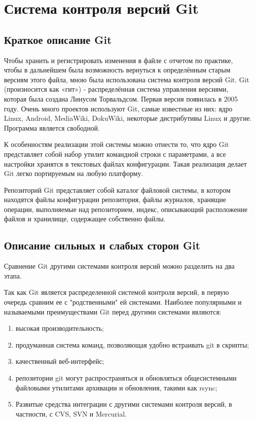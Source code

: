 \documentclass[a4paper,14pt]{report} %
\begin{document}
\chapter{Система контроля версий Git}
\section{Краткое описание Git}
Чтобы хранить и регистрировать изменения в файле с отчетом по практике, чтобы в дальнейшем была возможность вернуться к определённым старым версиям этого файла, мною была использована система контроля версий Git. Git (произносится как «гит») - распределённая система управления версиями, которая была создана Линусом Торвальдсом. Первая версия появилась в 2005 году. Очень много проектов используют Git, самые известные из них: ядро Linux, Android, MediaWiki, DokuWiki,  некоторые дистрибутивы Linux и другие. Программа является свободной. 

К особенностям реализации этой системы можно отнести то, что ядро Git представляет собой набор утилит командной строки с параметрами, а все настройки хранятся в текстовых файлах конфигурации. Такая реализация делает Git легко портируемым на любую платформу.

Репозиторий Git представляет собой каталог файловой системы, в котором находятся файлы конфигурации репозитория, файлы журналов, хранящие операции, выполняемые над репозиторием, индекс, описывающий расположение файлов и хранилище, содержащее собственно файлы. 
\section{Описание сильных и слабых сторон Git }
Сравнение Git другими системами контроля версий можно разделить на два этапа. 

Так как Git является распределенной системой контроля версий, в первую очередь сравним ее с "родственными" ей системами. Наиболее популярными и называемыми преимуществами Git перед другими системами являются:
\begin{enumerate} %
\item высокая производительность;
\item продуманная система команд, позволяющая удобно встраивать git в скрипты;
\item качественный веб-интерфейс;
\item репозитории git могут распространяться и обновляться общесистемными файловыми утилитами архивации и обновления, такими как rsync;
\item Развитые средства интеграции с другими системами контроля версий, в частности, с CVS, SVN и Mercurial.
\end{enumerate}
\end{document}
